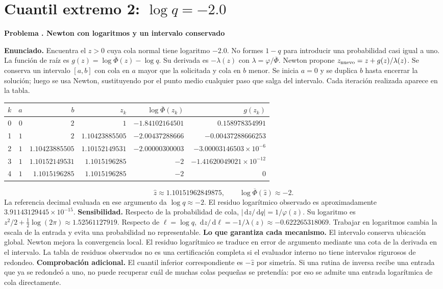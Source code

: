 \documentclass[11pt,a4paper]{article}
\newcommand{\dd}{\,\mathrm d}
\theoremstyle{definition}
\newcounter{problema}
\newenvironment{resuelto}[1]{\refstepcounter{problema}\par\medskip\Needspace{6\baselineskip}\textbf{Problema \theproblema. #1}\par}{\par\medskip}
\newcommand{\SF}{\overline\Phi}
\begin{document}
\section{\texorpdfstring{Cuantil extremo 2: $\log q=-2.0$}{Cuantil extremo 2: log q=-2.0}}
\begin{resuelto}{Newton con logaritmos y un intervalo conservado}
\textbf{Enunciado.} Encuentra el $z>0$ cuya cola normal tiene logaritmo $-2.0$. No formes $1-q$ para introducir una probabilidad casi igual a uno.
La función de raíz es $g(z)=\log\SF(z)-\log q$. Su derivada es $-\lambda(z)$ con $\lambda=\varphi/\SF$. Newton propone $z_{\rm nuevo}=z+g(z)/\lambda(z)$. Se conserva un intervalo $[a,b]$ con cola en $a$ mayor que la solicitada y cola en $b$ menor.
Se inicia $a=0$ y se duplica $b$ hasta encerrar la solución; luego se usa Newton, sustituyendo por el punto medio cualquier paso que salga del intervalo. Cada iteración realizada aparece en la tabla.

\begin{center}\small\begin{tabular}{rrrrrr}
\toprule
$k$&$a$&$b$&$z_k$&$\log\SF(z_k)$&$g(z_k)$\\
\midrule
0&$0$&$2$&$1$&$-1.84102164501$&$0.158978354991$\\
1&$1$&$2$&$1.10423885505$&$-2.00437288666$&$-0.00437288666253$\\
2&$1$&$1.10423885505$&$1.10152149531$&$-2.00000300003$&$-3.00003146503\times10^{-6}$\\
3&$1$&$1.10152149531$&$1.1015196285$&$-2$&$-1.41620049021\times10^{-12}$\\
4&$1$&$1.1015196285$&$1.1015196285$&$-2$&$0$\\
\bottomrule\end{tabular}\end{center}
\[
\widehat z\approx1.10151962849875,\qquad \log\SF(\widehat z)\approx-2.
\]
La referencia decimal evaluada en ese argumento da $\log q\approx-2$. El residuo logarítmico observado es aproximadamente $3.91143129445\times10^{-15}$.
\textbf{Sensibilidad.} Respecto de la probabilidad de cola, $|\dd z/\dd q|=1/\varphi(z)$. Su logaritmo es $z^2/2+\tfrac12\log(2\pi)\approx1.52561127919$. Respecto de $\ell=\log q$, $\dd z/\dd\ell=-1/\lambda(z)\approx-0.622265318069$. Trabajar en logaritmos cambia la escala de la entrada y evita una probabilidad no representable.
\textbf{Lo que garantiza cada mecanismo.} El intervalo conserva ubicación global. Newton mejora la convergencia local. El residuo logarítmico se traduce en error de argumento mediante una cota de la derivada en el intervalo. La tabla de residuos observados no es una certificación completa si el evaluador interno no tiene intervalos rigurosos de redondeo.
\textbf{Comprobación adicional.} El cuantil inferior correspondiente es $-\widehat z$ por simetría. Si una rutina de inversa recibe una entrada que ya se redondeó a uno, no puede recuperar cuál de muchas colas pequeñas se pretendía: por eso se admite una entrada logarítmica de cola directamente.
\end{resuelto}
\end{document}
